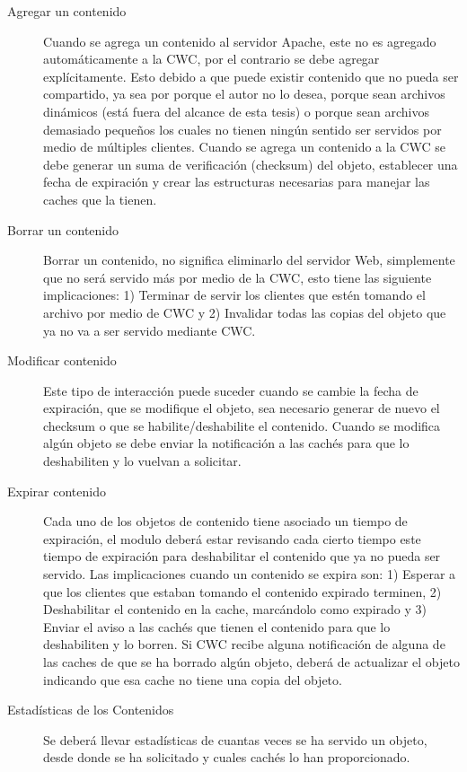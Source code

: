 \begin{description}
\item[Agregar un contenido] Cuando se agrega un contenido al servidor Apache, este no es agregado automáticamente a la CWC, por el contrario se debe agregar explícitamente. Esto debido a que puede existir contenido que no pueda ser compartido, ya sea por porque el autor no lo desea, porque sean archivos dinámicos (está fuera del alcance de esta tesis) o porque sean archivos demasiado pequeños los cuales no tienen ningún sentido ser servidos por medio de múltiples clientes. Cuando se agrega un contenido a la CWC se debe generar un suma de verificación (checksum) del objeto, establecer una fecha de expiración y crear las estructuras necesarias para manejar las caches que la tienen.

\item[Borrar un contenido] Borrar un contenido, no significa eliminarlo del servidor Web, simplemente que no será servido más por medio de la CWC, esto tiene las siguiente implicaciones: 1) Terminar de servir los clientes que estén tomando el archivo por medio de CWC y 2) Invalidar todas las copias del objeto que ya no va a ser servido mediante CWC.

\item [Modificar contenido] Este tipo de interacción puede suceder cuando se cambie la fecha de expiración, que se modifique el objeto, sea necesario generar de nuevo el checksum o que se habilite/deshabilite el contenido. Cuando se modifica algún objeto se debe enviar la notificación a las cachés para que lo deshabiliten y lo vuelvan a solicitar.

\item [Expirar contenido] Cada uno de los objetos de contenido tiene asociado un tiempo de expiración, el modulo deberá estar revisando cada cierto tiempo este tiempo de expiración para deshabilitar el contenido que ya no pueda ser servido. Las implicaciones cuando un contenido se expira son: 1) Esperar a que los clientes que estaban tomando el contenido expirado terminen, 2) Deshabilitar el contenido en la cache, marcándolo como expirado y 3) Enviar el aviso a las cachés que tienen el contenido para que lo deshabiliten y lo borren.
Si CWC recibe alguna notificación de alguna de las caches de que se ha borrado algún objeto, deberá de actualizar el objeto indicando que esa cache no tiene una copia del objeto.

\item[Estadísticas de los Contenidos] Se deberá llevar estadísticas de cuantas veces se ha servido un objeto, desde donde se ha solicitado y cuales cachés lo han proporcionado.
\end{description}

